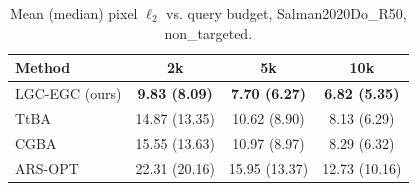 \begin{table}[t]
\centering\footnotesize
\caption{Mean (median) pixel $\ell_2$ vs. query budget, Salman2020Do\_R50, non\_targeted.}
\begin{tabular}{lccc}
\toprule
Method & 2k & 5k & 10k \\
\midrule
LGC-EGC (ours) & \textbf{9.83 (8.09)} & \textbf{7.70 (6.27)} & \textbf{6.82 (5.35)} \\
TtBA & 14.87 (13.35) & 10.62 (8.90) & 8.13 (6.29) \\
CGBA & 15.55 (13.63) & 10.97 (8.97) & 8.29 (6.32) \\
ARS-OPT & 22.31 (20.16) & 15.95 (13.37) & 12.73 (10.16) \\
\bottomrule
\end{tabular}
\end{table}
